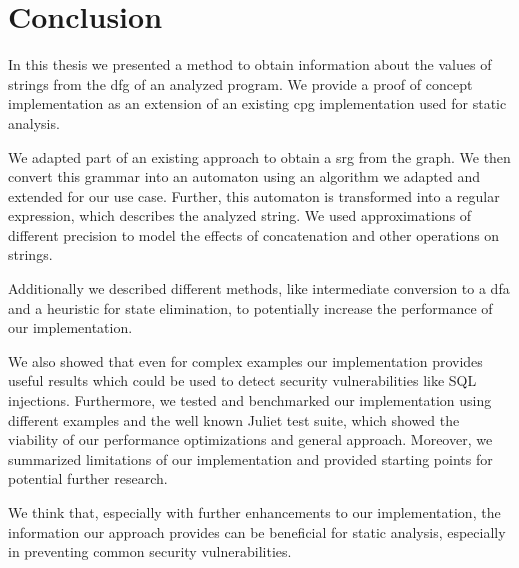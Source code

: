 \chapter{Conclusion}\label{chapter:Conclusion}

In this thesis we presented a method to obtain information about the values of strings from the \acl{dfg} of an analyzed program. We provide a proof of concept implementation as an extension of an existing \acl{cpg} implementation used for static analysis.

We adapted part of an existing approach to obtain a \acl{srg} from the graph. We then convert this grammar into an automaton using an algorithm we adapted and extended for our use case.
Further, this automaton is transformed into a regular expression, which describes the analyzed string. We used approximations of different precision to model the effects of concatenation and other operations on strings.

Additionally we described different methods, like intermediate conversion to a \ac{dfa} and a heuristic for state elimination, to potentially increase the performance of our implementation.

We also showed that even for complex examples our implementation provides useful results which could be used to detect security vulnerabilities like SQL injections.
Furthermore, we tested and benchmarked our implementation using different examples and the well known Juliet test suite, which showed the viability of our performance optimizations and general approach.
Moreover, we summarized limitations of our implementation and provided starting points for potential further research.

We think that, especially with further enhancements to our implementation, the information our approach provides can be beneficial for static analysis, especially in preventing common security vulnerabilities.

\begin{comment}	
Summarize your main contributions and observations. Further research directions?

$\leq 1$ page
content...
\end{comment}